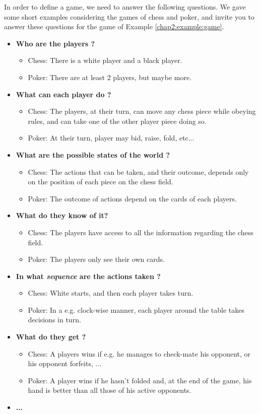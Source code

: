  In order to define a game, we need to answer the following questions. We gave some short examples considering the games of chess and poker, and invite you to answer these questions for the game of Example \ref{chap2:example:game}.
\begin{itemize}
\item \textbf{Who are the players ?}
\begin{itemize}
\item{Chess:} There is a white player and a black player.
\item{Poker:} There are at least 2 players, but maybe more.
\end{itemize}
 \item \textbf{What can each player do ?} 
\begin{itemize}
\item{Chess:} The players, at their turn, can move any chess piece while obeying rules, and can take one of the other player piece doing so.
\item{Poker:} At their turn, player may bid, raise, fold, etc...
\end{itemize} 
 \item \textbf{What are the possible states of the world ?}
\begin{itemize}
\item{Chess:} The actions that can be taken, and their outcome, depends only on the position of each piece on the chess field.
\item{Poker:} The outcome of actions depend on the cards of each players.
\end{itemize} 
 \item \textbf{What do they know of it?}
 \begin{itemize}
\item{Chess:} The players have access to all the information regarding the chess field.
\item{Poker:} The players only see their own cards.
\end{itemize} 
 \item \textbf{In what \emph{sequence} are the actions taken ?}
  \begin{itemize}
\item{Chess:} White starts, and then each player takes turn.
\item{Poker:} In a e.g. clock-wise manner, each player around the table takes decisions in turn.
\end{itemize} 
 \item \textbf{What do they get ?}
   \begin{itemize}
\item{Chess:} A players wins if e.g. he manages to check-mate his opponent, or his opponent forfeits, ...
\item{Poker:} A player wins if he hasn't folded and, at the end of the game, his hand is better than all those of his active opponents.
\end{itemize}
\item{\textbf{...}}
\end{itemize}

